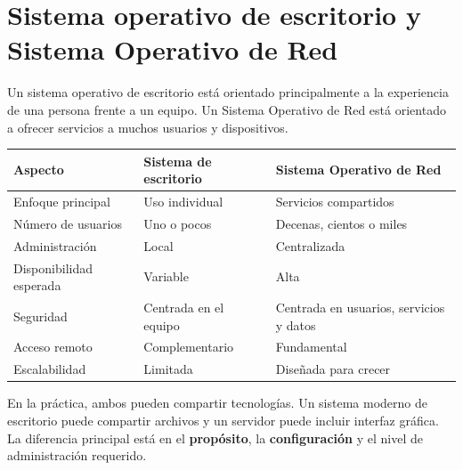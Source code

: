 \documentclass[
  spanish,
  letterpaper,
]{scrbook}
\newcounter{none} %
\begin{document}
\section{Sistema operativo de escritorio y Sistema Operativo de
Red}\label{sistema-operativo-de-escritorio-y-sistema-operativo-de-red}

Un sistema operativo de escritorio está orientado principalmente a la
experiencia de una persona frente a un equipo. Un Sistema Operativo de
Red está orientado a ofrecer servicios a muchos usuarios y dispositivos.

{\def\LTcaptype{none} %
\begin{longtable}[]{@{}
  >{\raggedright\arraybackslash}p{}
  >{\raggedright\arraybackslash}p{}
  >{\raggedright\arraybackslash}p{}@{}}
\toprule\noalign{}
\begin{minipage}[b]{\linewidth}\raggedright
Aspecto
\end{minipage} & \begin{minipage}[b]{\linewidth}\raggedright
Sistema de escritorio
\end{minipage} & \begin{minipage}[b]{\linewidth}\raggedright
Sistema Operativo de Red
\end{minipage} \\
\midrule\noalign{}
\endhead
\bottomrule\noalign{}
\endlastfoot
Enfoque principal & Uso individual & Servicios compartidos \\
Número de usuarios & Uno o pocos & Decenas, cientos o miles \\
Administración & Local & Centralizada \\
Disponibilidad esperada & Variable & Alta \\
Seguridad & Centrada en el equipo & Centrada en usuarios, servicios y
datos \\
Acceso remoto & Complementario & Fundamental \\
Escalabilidad & Limitada & Diseñada para crecer \\
\end{longtable}
}

En la práctica, ambos pueden compartir tecnologías. Un sistema moderno
de escritorio puede compartir archivos y un servidor puede incluir
interfaz gráfica. La diferencia principal está en el \textbf{propósito},
la \textbf{configuración} y el nivel de administración requerido.
\end{document}
